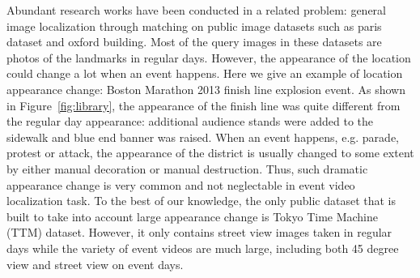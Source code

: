 Abundant research works have been conducted in a related problem: general image localization through matching\cite{Arandjelovic_2013_CVPR}\cite{Arandjelovic16}\cite{hays2008im2gps} on public image datasets such as paris dataset\cite{philbin08lost} and oxford building\cite{philbin07object}.
Most of the query images in these datasets are photos of the landmarks in regular days. 
However, the appearance of the location could change a lot when an event happens. 
Here we give an example of location appearance change: Boston Marathon 2013 finish line explosion event. 
As shown in Figure~\ref{fig:library}, the appearance of the finish line was quite different from the regular day appearance: additional audience stands were added to the sidewalk and blue end banner was raised. 
When an event happens, e.g. parade, protest or attack, the appearance of the district is usually changed to some extent by either manual decoration or manual destruction. 
Thus, such dramatic appearance change is very common and not neglectable in event video localization task. 
To the best of our knowledge, the only public dataset that is built to take into account large appearance change is Tokyo Time Machine (TTM) dataset\cite{Arandjelovic16}.  
However, it only contains street view images taken in regular days while the variety of event videos are much large, including both 45 degree view and street view on event days. 

